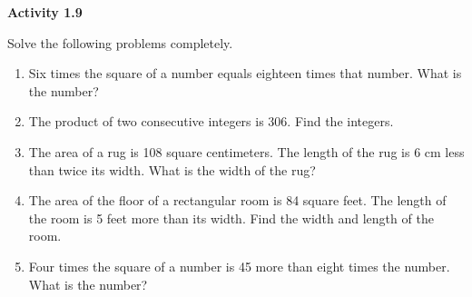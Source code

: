 \vspace{0.3ex}
\noindent\textbf{Activity 1.9}


Solve the following problems completely.

\begin{enumerate}%
   \item Six times the square of a number equals eighteen times that number. What is 
the number?
   \item The product of two consecutive integers is 306. Find the integers.
   \item The area of a rug is 108 square centimeters.  The length of the rug is 6 cm less 
than twice its width.  What is the width of the rug?
   \item The area of the floor of a rectangular room is 84 square feet. The length of the room is 5 feet more than its width. Find the width and length of the room.
   \item Four times the square of a number is 45 more than eight times the number.  What 
is the number?
\end{enumerate}
                     
 

 

 





 

 

 

 


                                          
